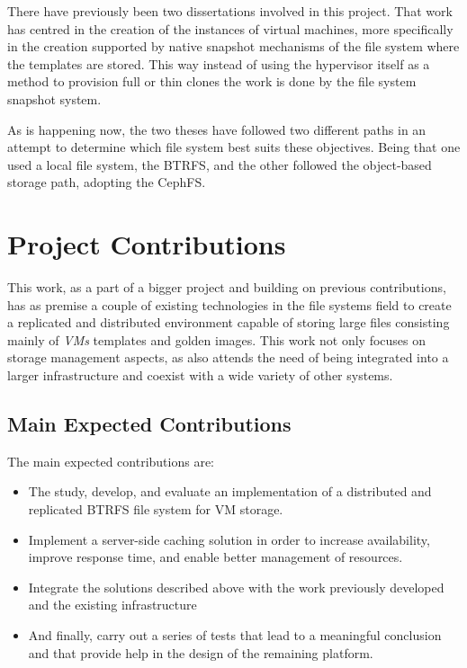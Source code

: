 There have previously been two dissertations involved in this project. That work has centred in the creation of the instances of virtual machines, more specifically in the creation supported by native snapshot mechanisms of the file system where the templates are stored. This way instead of using the hypervisor itself as a method to provision full or thin clones the work is done by the file system snapshot system.

As is happening now, the two theses have followed two different paths in an attempt to determine which file system best suits these objectives. Being that one used a local file system, the BTRFS, and the other followed the object-based storage path, adopting the CephFS.


\section{Project Contributions} %
\label{sec:project_contributions}

This work, as a part of a bigger project and building on previous contributions, has as premise a couple of existing technologies in the file systems field to create a replicated and distributed environment capable of storing large files consisting mainly of \textit{VMs} templates and golden images. This work not only focuses on storage management aspects, as also attends the need of being integrated into a larger infrastructure and coexist with a wide variety of other systems.
\\

\subsection{Main Expected Contributions} %
\label{sub:main_expected_contributions}

The main expected contributions are: 

\begin{itemize}

  \item The study, develop, and evaluate an implementation of a distributed and replicated BTRFS file system for VM storage.
  \item Implement a server-side caching solution in order to increase availability, improve response time, and enable better management of resources.
  \item Integrate the solutions described above  with the work previously developed and the existing infrastructure
  \item And finally, carry out a series of tests that lead to a meaningful conclusion and that provide help in the design of the remaining platform.

\end{itemize}

